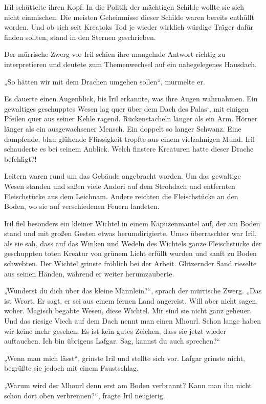 Iril schüttelte ihren Kopf. In die Politik der mächtigen Schilde wollte sie sich nicht einmischen. Die meisten Geheimnisse dieser Schilde waren bereits enthüllt worden. Und ob sich seit Kreatoks Tod je wieder wirklich würdige Träger dafür finden sollten, stand in den Sternen geschrieben.

Der mürrische Zwerg vor Iril schien ihre mangelnde Antwort richtig zu interpretieren und deutete zum Themenwechsel auf ein nahegelegenes Hausdach.

„So hätten wir mit dem Drachen umgehen sollen“, murmelte er.

Es dauerte einen Augenblick, bis Iril erkannte, was ihre Augen wahrnahmen. Ein gewaltiges geschupptes Wesen lag quer über dem Dach des Palas‘, mit einigen Pfeilen quer aus seiner Kehle ragend. Rückenstacheln länger als ein Arm. Hörner länger als ein ausgewachsener Mensch. Ein doppelt so langer Schwanz. Eine dampfende, blau glühende Flüssigkeit tropfte aus einem vielzahnigen Mund. Iril schauderte es bei seinem Anblick. Welch finstere Kreaturen hatte dieser Drache befehligt?!

Leitern waren rund um das Gebäude angebracht worden. Um das gewaltige Wesen standen und saßen viele Andori auf dem Strohdach und entfernten Fleischstücke aus dem Leichnam. Andere reichten die Fleischstücke an den Boden, wo sie auf verschiedenen Feuern landeten.

Iril fiel besonders ein kleiner Wichtel in einem Kapuzenmantel auf, der am Boden stand und mit großen Gesten etwas herumdirigierte. Umso überraschter war Iril, als sie sah, dass auf das Winken und Wedeln des Wichtels ganze Fleischstücke der geschuppten toten Kreatur von grünem Licht erfüllt wurden und sanft zu Boden schwebten. Der Wichtel grinste fröhlich bei der Arbeit. Glitzernder Sand rieselte aus seinen Händen, während er weiter herumzauberte.

„Wunderst du dich über das kleine Männlein?“, sprach der mürrische Zwerg. „Das ist Wrort. Er sagt, er sei aus einem fernen Land angereist. Will aber nicht sagen, woher. Magisch begabte Wesen, diese Wichtel. Mir sind sie nicht ganz geheuer. Und das riesige Viech auf dem Dach nennt man einen Mhourl. Schon lange haben wir keine mehr gesehen. Es ist kein gutes Zeichen, dass sie jetzt wieder auftauchen. Ich bin übrigens Lafgar. Sag, kannst du auch sprechen?“

„Wenn man mich lässt“, grinste Iril und stellte sich vor. Lafgar grinste nicht, begrüßte sie jedoch mit einem Faustschlag.

„Warum wird der Mhourl denn erst am Boden verbrannt? Kann man ihn nicht schon dort oben verbrennen?“, fragte Iril neugierig.

